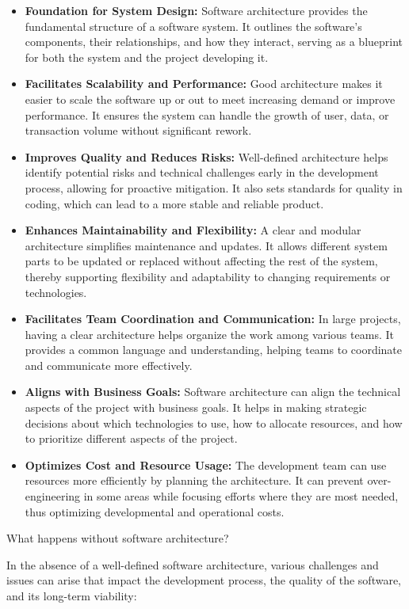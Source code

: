 \begin{itemize}
    \item \textbf{Foundation for System Design:} Software architecture provides the fundamental structure of a software system. It outlines the software's components, their relationships, and how they interact, serving as a blueprint for both the system and the project developing it.
    \item \textbf{Facilitates Scalability and Performance:} Good architecture makes it easier to scale the software up or out to meet increasing demand or improve performance. It ensures the system can handle the growth of user, data, or transaction volume without significant rework.
    \item \textbf{Improves Quality and Reduces Risks:} Well-defined architecture helps identify potential risks and technical challenges early in the development process, allowing for proactive mitigation. It also sets standards for quality in coding, which can lead to a more stable and reliable product.
    \item \textbf{Enhances Maintainability and Flexibility:} A clear and modular architecture simplifies maintenance and updates. It allows different system parts to be updated or replaced without affecting the rest of the system, thereby supporting flexibility and adaptability to changing requirements or technologies.
    \item \textbf{Facilitates Team Coordination and Communication:} In large projects, having a clear architecture helps organize the work among various teams. It provides a common language and understanding, helping teams to coordinate and communicate more effectively.
    \item \textbf{Aligns with Business Goals:} Software architecture can align the technical aspects of the project with business goals. It helps in making strategic decisions about which technologies to use, how to allocate resources, and how to prioritize different aspects of the project.
    \item \textbf{Optimizes Cost and Resource Usage:} The development team can use resources more efficiently by planning the architecture. It can prevent over-engineering in some areas while focusing efforts where they are most needed, thus optimizing developmental and operational costs.
\end{itemize}

What happens without software architecture?~\cite{openai2023chatgpt}

In the absence of a well-defined software architecture, various challenges and issues can arise that impact the development process, the quality of the software, and its long-term viability:

